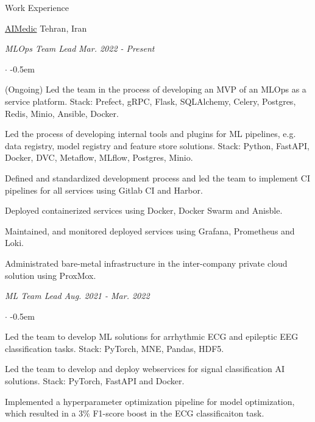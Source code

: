 \documentclass[../professional-cv.tex]{subfiles}
\begin{document}
\begin{rSection}{Work Experience}

	\begin{rWorkSection}
		{\href{https://aimedic.co/}{AIMedic}}
		{Tehran, Iran}

		\vspace{-1em}
		{\em MLOps Team Lead} \hfill {\em Mar. 2022 - Present} \hspace{10pt}
		\normalfont
		\begin{list}{$\cdot$}{\leftmargin=10pt\normalfont \rightmargin=20pt}
			\itemsep -0.5em
			\item (Ongoing) Led the team in the process of developing an MVP of an MLOps as a service platform. Stack: Prefect, gRPC, Flask, SQLAlchemy, Celery, Postgres, Redis, Minio, Ansible, Docker.
			\item Led the process of developing internal tools and plugins for ML pipelines, e.g. data registry, model registry and feature store solutions. Stack: Python, FastAPI, Docker, DVC, Metaflow, MLflow, Postgres, Minio.
			\item Defined and standardized development process and led the team to implement CI pipelines for all services using Gitlab CI and Harbor.
			\item Deployed containerized services using Docker, Docker Swarm and Anisble.
			\item Maintained, and monitored deployed services using Grafana, Prometheus and Loki.
			\item Administrated bare-metal infrastructure in the inter-company private cloud solution using ProxMox.

		\end{list}
		{\em ML Team Lead} \hfill {\em Aug. 2021 - Mar. 2022}
		\normalfont
		\begin{list}{$\cdot$}{\leftmargin=10pt\normalfont \rightmargin=20pt}
			\itemsep -0.5em
			\item Led the team to develop ML solutions for arrhythmic ECG and epileptic EEG classification tasks. Stack: PyTorch, MNE, Pandas, HDF5.
			\item Led the team to develop and deploy webservices for signal classification AI solutions. Stack: PyTorch, FastAPI and Docker.
			\item Implemented a hyperparameter optimization pipeline for model optimization, which resulted in a 3\% F1-score boost in the ECG classificaiton task.
		\end{list}
	\end{rWorkSection}


\end{rSection}
\end{document}
